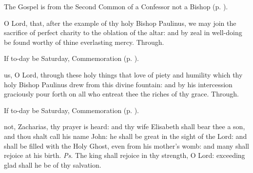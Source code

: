 
\begin{rubric}
	The Gospel is from the Second Common of a Confessor not a Bishop (p. \pageref{CommonConfessorNotBishopIIGospel}).
\end{rubric}


\secret\label{PaulinusSecret}
 O Lord, that, after the example of thy holy Bishop Paulinus, we may join the sacrifice of perfect charity to the oblation of the altar: and by zeal in well-doing be found worthy of thine everlasting mercy. Through.

\begin{rubric}
	If to-day be Saturday, Commemoration  (p. \pageref{JohnBaptistVigilSecret}).
\end{rubric}


\postcommunion\label{PaulinusPostcommunion}
 us, O Lord, through these holy things that love of piety and humility which thy holy Bishop Paulinus drew from this divine fountain: and by his intercession graciously pour forth on all who entreat thee the riches of thy grace. Through.

\begin{rubric}
	If to-day be Saturday, Commemoration  (p. \pageref{JohnBaptistVigilPostcommunion}).
\end{rubric}



\introit
{} not, Zacharias, thy prayer is heard: and thy wife Elisabeth shall bear thee a son, and thou shalt call his name John: he shall be great in the sight of the Lord: and shall be filled with the Holy Ghost, even from his mother's womb: and many shall rejoice at his birth. \textit{Ps.} The king shall rejoice in thy strength, O Lord: exceeding glad shall he be of thy salvation.

